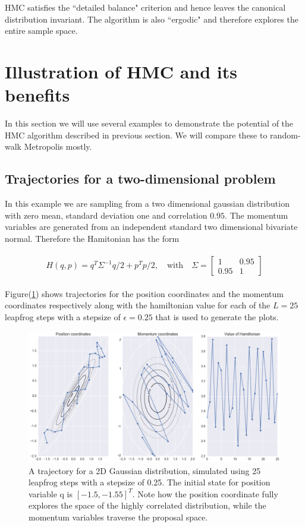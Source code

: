 \documentclass{article}
\numberwithin{equation}{section}
\begin{document}
HMC satisfies the ``detailed balance" criterion and hence leaves the canonical distribution invariant. The algorithm is also ``ergodic" and therefore explores the entire sample space.

\section{Illustration of HMC and its benefits}
In this section we will use several examples to demonstrate the potential of the HMC algorithm described in previous section. We will compare these to random-walk Metropolis mostly.

\subsection{Trajectories for a two-dimensional problem}
In this example we are sampling from a two dimensional gaussian distribution with zero mean, standard deviation one and correlation $0.95$. The momentum variables are generated from an independent standard two dimensional bivariate normal. Therefore the Hamitonian has the form 


\begin{align}
\begin{split}
H(q,p) = q^T\Sigma^{-1}q/2 + p^Tp/2, \quad \textrm{with} \quad \Sigma = 
\begin{bmatrix}
    1 & 0.95 \\
    0.95 & 1
  \end{bmatrix}
\end{split}
\label{eq:5.1}
\end{align}

Figure(\ref{Fig:1}) shows trajectories for the position coordinates and the momentum coordinates respectively along with the hamiltonian value for each of the $L=25$ leapfrog steps with a stepsize of $\epsilon = 0.25$ that is used to generate the plots.\\

\begin{figure}[H]
\centering
  \includegraphics[width=1\linewidth]{HMC_eg.png}
  \caption{A trajectory for a 2D Gaussian distribution, simulated using 25 leapfrog steps with a stepsize of 0.25. The initial state for position variable q is $[-1.5,-1.55]^T$. Note how the position coordinate fully explores the space of the highly correlated distribution, while the momentum variables traverse the proposal space.}
\label{Fig:1}
\end{figure}
\end{document}
